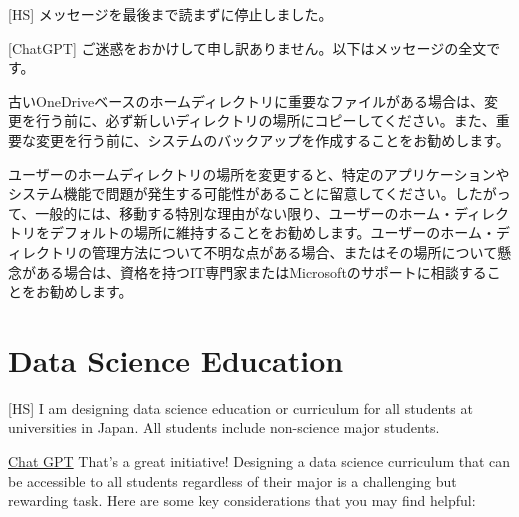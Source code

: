 \documentclass[
]{book}
\theoremstyle{definition}
\theoremstyle{definition}
\theoremstyle{definition}
\theoremstyle{definition}
\theoremstyle{remark}
\begin{document}
{[}HS{]} メッセージを最後まで読まずに停止しました。

{[}ChatGPT{]} ご迷惑をおかけして申し訳ありません。以下はメッセージの全文です。

古いOneDriveベースのホームディレクトリに重要なファイルがある場合は、変更を行う前に、必ず新しいディレクトリの場所にコピーしてください。また、重要な変更を行う前に、システムのバックアップを作成することをお勧めします。

ユーザーのホームディレクトリの場所を変更すると、特定のアプリケーションやシステム機能で問題が発生する可能性があることに留意してください。したがって、一般的には、移動する特別な理由がない限り、ユーザーのホーム・ディレクトリをデフォルトの場所に維持することをお勧めします。ユーザーのホーム・ディレクトリの管理方法について不明な点がある場合、またはその場所について懸念がある場合は、資格を持つIT専門家またはMicrosoftのサポートに相談することをお勧めします。

\hypertarget{dseducation}{%
\section{Data Science Education}\label{dseducation}}

{[}HS{]} I am designing data science education or curriculum for all students at universities in Japan. All students include non-science major students.

\protect\hyperlink{chatgpt}{Chat GPT} That's a great initiative! Designing a data science curriculum that can be accessible to all students regardless of their major is a challenging but rewarding task. Here are some key considerations that you may find helpful:
\end{document}
